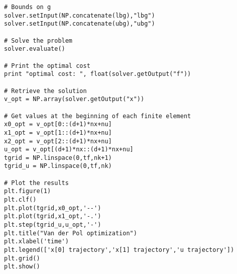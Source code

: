 \documentclass{article}
\begin{document}
\begin{parcolumns}[rulebetween]{2}
{\begin{lstlisting}
# Bounds on g
solver.setInput(NP.concatenate(lbg),"lbg")
solver.setInput(NP.concatenate(ubg),"ubg")

# Solve the problem
solver.evaluate()

# Print the optimal cost
print "optimal cost: ", float(solver.getOutput("f"))

# Retrieve the solution
v_opt = NP.array(solver.getOutput("x"))

# Get values at the beginning of each finite element
x0_opt = v_opt[0::(d+1)*nx+nu]
x1_opt = v_opt[1::(d+1)*nx+nu]
x2_opt = v_opt[2::(d+1)*nx+nu]
u_opt = v_opt[(d+1)*nx::(d+1)*nx+nu]
tgrid = NP.linspace(0,tf,nk+1)
tgrid_u = NP.linspace(0,tf,nk)

# Plot the results
plt.figure(1)
plt.clf()
plt.plot(tgrid,x0_opt,'--')
plt.plot(tgrid,x1_opt,'-.')
plt.step(tgrid_u,u_opt,'-')
plt.title("Van der Pol optimization")
plt.xlabel('time')
plt.legend(['x[0] trajectory','x[1] trajectory','u trajectory'])
plt.grid()
plt.show()
\end{lstlisting}
}

    
\end{parcolumns}
\end{document}
